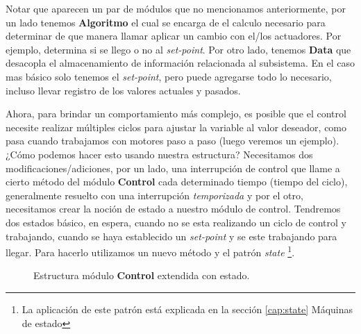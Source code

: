 Notar que aparecen un par de módulos que no mencionamos anteriormente, por un lado tenemos \textbf{Algoritmo} el cual se encarga de el calculo necesario para determinar de que manera llamar aplicar un cambio con el/los actuadores. Por ejemplo, determina si se llego o no al \textit{set-point}. Por otro lado, tenemos \textbf{Data} que desacopla el almacenamiento de información relacionada al subsistema. En el caso mas básico solo tenemos el \textit{set-point}, pero puede agregarse todo lo necesario, incluso llevar registro de los valores actuales y pasados.

Ahora, para brindar un comportamiento más complejo, es posible que el control necesite realizar múltiples ciclos para ajustar la variable al valor deseador, como pasa cuando trabajamos con motores paso a paso (luego veremos un ejemplo). ¿Cómo podemos hacer esto usando nuestra estructura? Necesitamos dos modificaciones/adiciones, por un lado, una interrupción de control que llame a cierto método del módulo \textbf{Control} cada determinado tiempo (tiempo del ciclo), generalmente resuelto con una interrupción \textit{temporizada} y por el otro, necesitamos crear la noción de estado a nuestro módulo de control. Tendremos dos estados básico, en espera, cuando no se esta realizando un ciclo de control y trabajando, cuando se haya establecido un \textit{set-point} y se este trabajando para llegar. Para hacerlo utilizamos un nuevo método y el patrón \textit{state} \footnote{La aplicación de este patrón está explicada en la sección \ref{cap:state} Máquinas de estado}.

\begin{figure}[h]
\caption{Estructura módulo \textbf{Control} extendida con estado.}
\begin{center}
\end{center}
\end{figure}

